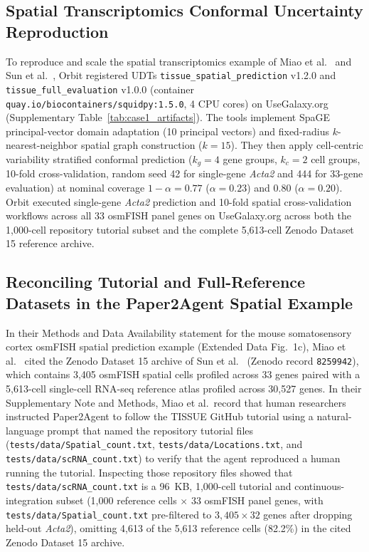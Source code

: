 \documentclass[11pt,letterpaper]{article}
\newcommand{\tool}[1]{\textsf{#1}}
\begin{document}
\subsection*{Spatial Transcriptomics Conformal Uncertainty Reproduction}
To reproduce and scale the spatial transcriptomics example of Miao et al.\ \cite{miao2026} and Sun et al.\ \cite{sun2024}, \tool{Orbit} registered UDTs \nolinkurl{tissue_spatial_prediction} v1.2.0 and \nolinkurl{tissue_full_evaluation} v1.0.0 (container \nolinkurl{quay.io/biocontainers/squidpy:1.5.0}, 4 CPU cores) on UseGalaxy.org (Supplementary Table~\ref{tab:case1_artifacts}). The tools implement \tool{SpaGE} principal-vector domain adaptation (10 principal vectors) and fixed-radius $k$-nearest-neighbor spatial graph construction ($k = 15$). They then apply cell-centric variability stratified conformal prediction ($k_g = 4$ gene groups, $k_c = 2$ cell groups, 10-fold cross-validation, random seed 42 for single-gene \textit{Acta2} and 444 for 33-gene evaluation) at nominal coverage $1 - \alpha = 0.77$ ($\alpha = 0.23$) and $0.80$ ($\alpha = 0.20$). \tool{Orbit} executed single-gene \textit{Acta2} prediction and 10-fold spatial cross-validation workflows across all 33 osmFISH panel genes on UseGalaxy.org across both the 1,000-cell repository tutorial subset and the complete 5,613-cell Zenodo Dataset 15 reference archive.

\subsection*{Reconciling Tutorial and Full-Reference Datasets in the \tool{Paper2Agent} Spatial Example}
In their Methods and Data Availability statement for the mouse somatosensory cortex osmFISH spatial prediction example (Extended Data Fig.~1c), Miao et al.\ \cite{miao2026} cited the Zenodo Dataset 15 archive of Sun et al.\ \cite{sun2024} (Zenodo record \texttt{8259942}), which contains 3,405 osmFISH spatial cells profiled across 33 genes paired with a 5,613-cell single-cell RNA-seq reference atlas profiled across 30,527 genes. In their Supplementary Note and Methods, Miao et al.\ record that human researchers instructed \tool{Paper2Agent} to follow the \tool{TISSUE} GitHub tutorial using a natural-language prompt that named the repository tutorial files (\nolinkurl{tests/data/Spatial_count.txt}, \nolinkurl{tests/data/Locations.txt}, and \nolinkurl{tests/data/scRNA_count.txt}) to verify that the agent reproduced a human running the tutorial. Inspecting those repository files showed that \nolinkurl{tests/data/scRNA_count.txt} is a 96~KB, 1,000-cell tutorial and continuous-integration subset (1,000 reference cells $\times$ 33 osmFISH panel genes, with \nolinkurl{tests/data/Spatial_count.txt} pre-filtered to $3{,}405 \times 32$ genes after dropping held-out \textit{Acta2}), omitting 4,613 of the 5,613 reference cells (82.2\%) in the cited Zenodo Dataset 15 archive.
\end{document}
